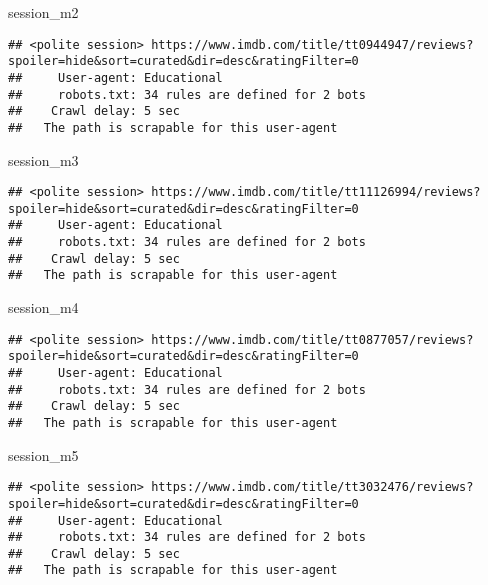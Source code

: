 \documentclass[
]{article}
\newenvironment{Shaded}{\begin{snugshade}}{\end{snugshade}}
\newcommand{\NormalTok}[1]{#1}
\begin{document}
\begin{Shaded}
\begin{Highlighting}[]
\NormalTok{session\_m2}
\end{Highlighting}
\end{Shaded}

\begin{verbatim}
## <polite session> https://www.imdb.com/title/tt0944947/reviews?spoiler=hide&sort=curated&dir=desc&ratingFilter=0
##     User-agent: Educational
##     robots.txt: 34 rules are defined for 2 bots
##    Crawl delay: 5 sec
##   The path is scrapable for this user-agent
\end{verbatim}

\begin{Shaded}
\begin{Highlighting}[]
\NormalTok{session\_m3}
\end{Highlighting}
\end{Shaded}

\begin{verbatim}
## <polite session> https://www.imdb.com/title/tt11126994/reviews?spoiler=hide&sort=curated&dir=desc&ratingFilter=0
##     User-agent: Educational
##     robots.txt: 34 rules are defined for 2 bots
##    Crawl delay: 5 sec
##   The path is scrapable for this user-agent
\end{verbatim}

\begin{Shaded}
\begin{Highlighting}[]
\NormalTok{session\_m4}
\end{Highlighting}
\end{Shaded}

\begin{verbatim}
## <polite session> https://www.imdb.com/title/tt0877057/reviews?spoiler=hide&sort=curated&dir=desc&ratingFilter=0
##     User-agent: Educational
##     robots.txt: 34 rules are defined for 2 bots
##    Crawl delay: 5 sec
##   The path is scrapable for this user-agent
\end{verbatim}

\begin{Shaded}
\begin{Highlighting}[]
\NormalTok{session\_m5}
\end{Highlighting}
\end{Shaded}

\begin{verbatim}
## <polite session> https://www.imdb.com/title/tt3032476/reviews?spoiler=hide&sort=curated&dir=desc&ratingFilter=0
##     User-agent: Educational
##     robots.txt: 34 rules are defined for 2 bots
##    Crawl delay: 5 sec
##   The path is scrapable for this user-agent
\end{verbatim}
\end{document}
